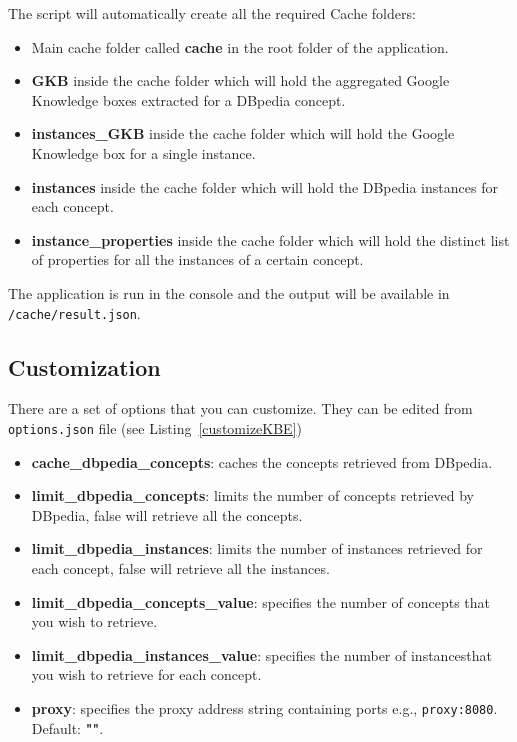 The script will automatically create all the required Cache folders:

\begin{itemize}
	\item Main cache folder called \textbf{cache} in the root folder of the application.
	\item \textbf{GKB} inside the cache folder which will hold the aggregated Google Knowledge boxes extracted for a DBpedia concept.
	\item \textbf{instances\_GKB} inside the cache folder which will hold the Google Knowledge box for a single instance.
	\item \textbf{instances} inside the cache folder which will hold the DBpedia instances for each concept.
	\item \textbf{instance\_properties} inside the cache folder which will hold the distinct list of properties for all the instances of a certain concept.
\end{itemize}

The application is run in the console and the output will be available in \texttt{/cache/result.json}.

\subsection{Customization}

There are a set of options that you can customize. They can be edited from \texttt{options.json} file (see Listing~\ref{customizeKBE})



\begin{itemize}
	\item \textbf{cache\_dbpedia\_concepts}: caches the concepts retrieved from
	  DBpedia.
	\item \textbf{limit\_dbpedia\_concepts}: limits the number of concepts
	  retrieved by DBpedia, false will retrieve all the concepts.
	\item \textbf{limit\_dbpedia\_instances}: limits the number of instances
	  retrieved for each concept, false will retrieve all the instances.
	\item \textbf{limit\_dbpedia\_concepts\_value}: specifies the number of concepts that you wish to retrieve.
	\item \textbf{limit\_dbpedia\_instances\_value}: specifies the number of instancesthat  you wish to retrieve for each concept.
	\item \textbf{proxy}: specifies the proxy address string containing ports e.g., \texttt{proxy:8080}. Default: \textbf{""}.
\end{itemize}

